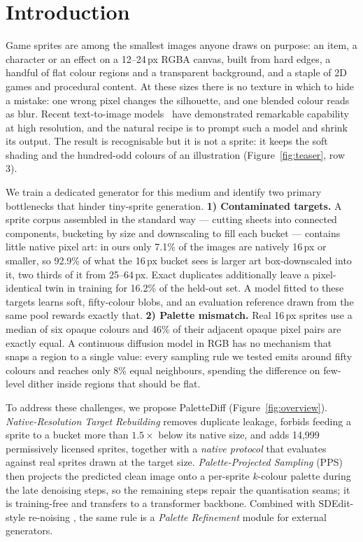 \documentclass{article} %
\newcommand{\ours}{PaletteDiff}
\begin{document}
\section{Introduction}
\label{sec:intro}

Game sprites are among the smallest images anyone draws on purpose: an item, a character or an effect on a 12--24\,px
RGBA canvas, built from hard edges, a handful of flat colour regions and a transparent background, and a staple of 2D
games and procedural content. At these sizes there is no texture in which to hide a mistake: one wrong pixel changes the silhouette, and one blended
colour reads as blur. Recent text-to-image models~\citep{Podell2023,FLUX2} have demonstrated remarkable capability at
high resolution, and the natural recipe is to prompt such a model and shrink its output. The result is recognisable
but it is not a sprite: it keeps the soft shading and the hundred-odd colours of an illustration
(Figure~\ref{fig:teaser}, row 3).

We train a dedicated generator for this medium and identify two primary bottlenecks that hinder tiny-sprite
generation. \textbf{1) Contaminated targets.} A sprite corpus assembled in the standard way --- cutting sheets into
connected components, bucketing by size and downscaling to fill each bucket --- contains little native pixel art: in
ours only 7.1\% of the images are natively 16\,px or smaller, so 92.9\% of what the 16\,px bucket sees is larger art
box-downscaled into it, two thirds of it from 25--64\,px. Exact duplicates additionally leave a pixel-identical twin in training for 16.2\% of
the held-out set. A model fitted to these targets learns soft, fifty-colour blobs, and an evaluation reference drawn
from the same pool rewards exactly that. \textbf{2) Palette mismatch.} Real 16\,px sprites use a median of six opaque
colours and 46\% of their adjacent opaque pixel pairs are exactly equal. A continuous diffusion model in RGB has no
mechanism that snaps a region to a single value: every sampling rule we tested emits around fifty colours and reaches
only 8\% equal neighbours, spending the difference on few-level dither inside regions that should be flat.

To address these challenges, we propose \ours{} (Figure~\ref{fig:overview}). \emph{Native-Resolution Target Rebuilding}
removes duplicate leakage, forbids feeding a sprite to a bucket more than $1.5\times$ below its native size, and adds
14{,}999 permissively licensed sprites, together with a \emph{native protocol} that evaluates against real sprites
drawn at the target size. \emph{Palette-Projected Sampling} (PPS) then projects the predicted clean image onto a
per-sprite $k$-colour palette during the late denoising steps, so the remaining steps repair the quantisation seams;
it is training-free and transfers to a transformer backbone. Combined with SDEdit-style re-noising
\citep{Meng2022sdedit}, the same rule is a \emph{Palette Refinement} module for external generators.
\end{document}
